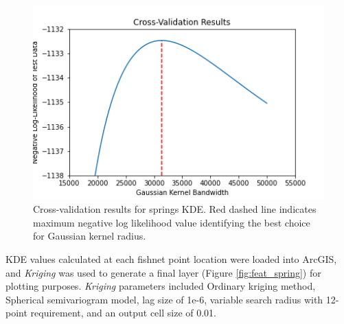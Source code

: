 \begin{figure}[!htp]
\centering
\includegraphics[scale=.50]{templates/images/Figure-Springs_kde_gridsearchcv2.png}
\caption[Spring density parameter tuning]{Cross-validation results for springs KDE. Red dashed line indicates maximum negative log likelihood value identifying the best choice for Gaussian kernel radius.}
\label{fig:spring_cv}
\end{figure}

KDE values calculated at each fishnet point location were loaded into ArcGIS, and \textit{Kriging} was used to generate a final layer (Figure \ref{fig:feat_spring}) for plotting purposes. \textit{Kriging} parameters included Ordinary kriging method, Spherical semivariogram model, lag size of 1e-6, variable search radius with 12-point requirement, and an output cell size of 0.01. 

